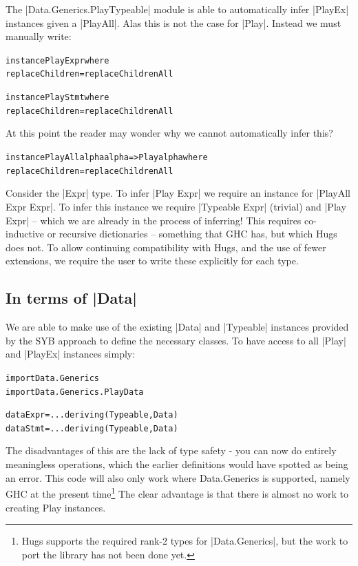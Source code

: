\documentclass[preprint]{sigplanconf}
\newenvironment{code}{\begin{alltt}\small}{\end{alltt}}
\begin{document}
The |Data.Generics.PlayTypeable| module is able to automatically infer |PlayEx| instances given a |PlayAll|. Alas this is not the case for |Play|. Instead we must manually write:

\begin{code}
instance Play Expr where
    replaceChildren = replaceChildrenAll

instance Play Stmt where
    replaceChildren = replaceChildrenAll
\end{code}

At this point the reader may wonder why we cannot automatically infer this?

\begin{code}
instance PlayAll alpha alpha => Play alpha where
    replaceChildren = replaceChildrenAll
\end{code}

Consider the |Expr| type. To infer |Play Expr| we require an instance for |PlayAll Expr Expr|. To infer this instance we require |Typeable Expr| (trivial) and |Play Expr| -- which we are already in the process of inferring! This requires co-inductive or recursive dictionaries -- something that GHC has, but which Hugs does not. To allow continuing compatibility with Hugs, and the use of fewer extensions, we require the user to write these explicitly for each type.


\subsection{In terms of |Data|}

We are able to make use of the existing |Data| and |Typeable| instances provided by the SYB approach to define the necessary classes. To have access to all |Play| and |PlayEx| instances simply:

\begin{code}
import Data.Generics
import Data.Generics.PlayData

data Expr  = ... \? \? deriving (Typeable, Data)
data Stmt  = ... \? \? deriving (Typeable, Data)
\end{code}

The disadvantages of this are the lack of type safety - you can now do entirely meaningless operations, which the earlier definitions would have spotted as being an error. This code will also only work where Data.Generics is supported, namely GHC at the present time\footnote{Hugs supports the required rank-2 types for |Data.Generics|, but the work to port the library has not been done yet.} The clear advantage is that there is almost no work to creating Play instances.
\end{document}
